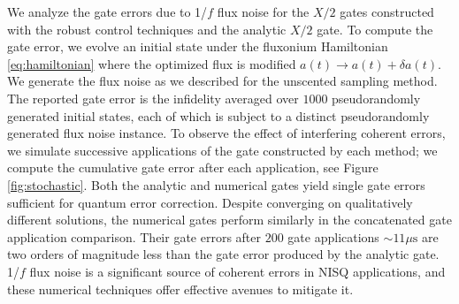 We analyze the gate errors due to 1/$f$ flux noise for
the $X/2$ gates constructed with the robust control techniques
and the analytic $X/2$ gate. To compute the gate error,
we evolve an initial state
under the fluxonium Hamiltonian \eqref{eq:hamiltonian}
where the optimized flux is modified $a(t) \rightarrow a(t) + \delta a(t)$.
We generate the flux noise as
we described for the unscented sampling method.
The reported gate error is the infidelity
averaged over $1000$ pseudorandomly generated initial states,
each of which is subject to a distinct pseudorandomly
generated flux noise instance.
To observe the effect of interfering coherent errors,
we simulate successive applications of the gate constructed by each method;
we compute the cumulative gate error
after each application, see Figure \ref{fig:stochastic}.
Both the analytic
and numerical gates yield single gate errors
sufficient for quantum error correction.
Despite converging on qualitatively different solutions, the
numerical gates perform similarly in the concatenated
gate application comparison. Their gate errors
after $200$ gate applications $\sim 11 \mu\textrm{s}$ are
two orders of magnitude less than the gate error produced by the analytic gate.
1/$f$ flux noise is a significant source of coherent errors in NISQ applications,
and these numerical techniques offer effective avenues to mitigate it.

